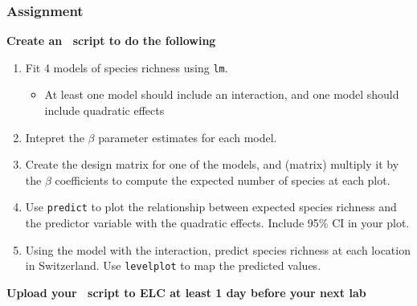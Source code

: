 \documentclass[color=usenames,dvipsnames]{beamer}\usepackage[]{graphicx}\usepackage[]{color}
\newcommand{\inr}[1]{\colorbox{inlinecolor}{\texttt{#1}}}
\begin{document}
\begin{frame}
  \frametitle{Assignment}
  {\bf Create an \R~script to do the following \\}
  \begin{enumerate}
    \normalsize
    \item Fit 4 models of species richness using \inr{lm}.
      \begin{itemize} \large
        \item At least one model should include an interaction, and
          one model should include quadratic effects
      \end{itemize}
    \item Intepret the $\beta$ parameter estimates for each model.
    \item Create the design matrix for one of the models, and (matrix)
      multiply it by the $\beta$ coefficients to compute the expected
      number of species at each plot.  
    \item Use \inr{predict} to plot the relationship between expected
      species richness and the predictor variable with the quadratic
      effects. Include 95\% CI in your plot.
    \item Using the model with the interaction, predict species
      richness at each location in Switzerland. Use \inr{levelplot} to
      map the predicted values.
    \end{enumerate}
    \centering
    \small
    \bf
    Upload your \R~script to ELC at least 1 day before your next lab \\
\end{frame}
\end{document}
